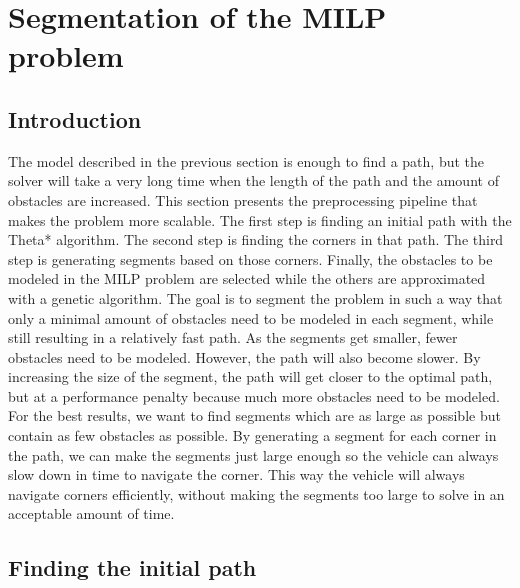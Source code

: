 \section{Segmentation of the MILP problem}
\label{section:segment}


\subsection{Introduction}
The model described in the previous section is enough to find a path, but the solver will take a very long time when the length of the path and the amount of obstacles are increased. This section presents the preprocessing pipeline that makes the problem more scalable. The first step is finding an initial path with the Theta* algorithm. The second step is finding the corners in that path. The third step is generating segments based on those corners. Finally, the obstacles to be modeled in the MILP problem are selected while the others are approximated with a genetic algorithm. The goal is to segment the problem in such a way that only a minimal amount of obstacles need to be modeled in each segment, while still resulting in a relatively fast path. As the segments get smaller, fewer obstacles need to be modeled. However, the path will also become slower. By increasing the size of the segment, the path will get closer to the optimal path, but at a performance penalty because much more obstacles need to be modeled.\\
For the best results, we want to find segments which are as large as possible but contain as few obstacles as possible. By generating a segment for each corner in the path, we can make the segments just large enough so the vehicle can always slow down in time to navigate the corner. This way the vehicle will always navigate corners  efficiently, without making the segments too large to solve in an acceptable amount of time.
\subsection{Finding the initial path}

